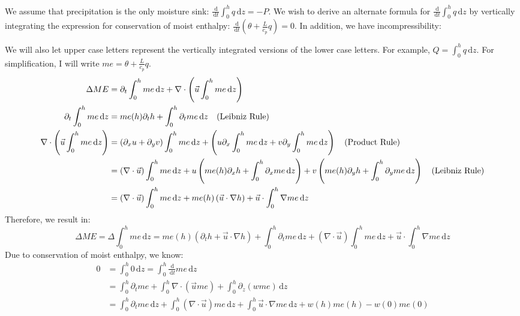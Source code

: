 \documentclass[10pt]{article}
\newcommand{\rmd}{\,\mathrm{d}}
\begin{document}
 
 We assume that precipitation is the only  moisture sink: $\frac{\rmd}{\rmd t} \int_{0}^{h} q \rmd z = - P$. We wish to derive an alternate formula for $\frac{\rmd}{\rmd t} \int_{0}^{h} q \rmd z$ by vertically integrating the expression for conservation of moist enthalpy: $\frac{\rmd}{\rmd t} (\theta + \frac{L}{c_p} q) = 0$.  
 In addition, we have incompressibility:

  We will also let upper case letters represent the vertically integrated versions of the lower case letters. For example, $Q = \int_0^h q \rmd z$. For simplification, I will write $me = \theta + \frac{L}{c_p}q$. 
 \begin{align*}
 \Delta ME &= \partial_t \int_{0}^{h} me \rmd z + \nabla \cdot \left(\vec{u}\int_{0}^{h} me \rmd z\right) \\
 \partial_t \int_{0}^{h} me \rmd z  &= me(h)\partial_t h + \int_{0}^{h} \partial_tme \rmd z\text{\quad(Leibniz Rule)} \\
 \nabla \cdot \left(\vec{u}\int_{0}^{h} me \rmd z\right) &= \left(\partial_x u + \partial_y v \right) \int_{0}^{h} me \rmd z + \left(u \partial_x \int_{0}^{h} me \rmd z + v \partial_y \int_{0}^{h} me \rmd z\right) \text{\quad (Product Rule)}\\
 &= \left(\nabla \cdot\vec{u} \right)\int_{0}^{h} me \rmd z + u \left(me(h)\partial_x h + \int_{0}^{h} \partial_x me \rmd z\right) + v \left(me(h)\partial_y h + \int_{0}^{h} \partial_y me \rmd z\right)\text{\quad(Leibniz Rule)} \\
 &= \left(\nabla \cdot\vec{u} \right)\int_{0}^{h} me \rmd z + me(h)\left(\vec{u}\cdot \nabla h\right) + \vec{u}\cdot \int_{0}^{h}\nabla me \rmd z \\
 \end{align*} 
Therefore, we result in: 
 \begin{equation}
 \Delta ME = \Delta\int_{0}^{h} me \rmd z = me(h)\left( \partial_t h + \vec{u}\cdot \nabla h\right) + \int_{0}^{h} \partial_tme \rmd z + \left(\nabla \cdot\vec{u} \right)\int_{0}^{h} me \rmd z + \vec{u}\cdot \int_{0}^{h}\nabla me \rmd z
 \label{ME}
 \end{equation}
 Due to conservation of moist enthalpy, we know:
 \begin{align*}
 0 &= \int_{0}^{h} 0 \rmd z = \int_{0}^{h} \frac{\rmd}{\rmd t} me \rmd z \\
 &= \int_{0}^{h} \partial_t me +\int_{0}^{h} \nabla \cdot \left(\vec{u}me\right) + \int_{0}^{h}\partial_z (wme) \rmd z\\
 &= \int_{0}^{h} \partial_t me \rmd z + \int_{0}^{h} \left(\nabla \cdot \vec{u}\right) me \rmd z +\int_{0}^h \vec{u} \cdot \nabla me \rmd z + w(h)me(h)-w(0)me(0)
 \end{align*}
\end{document}
